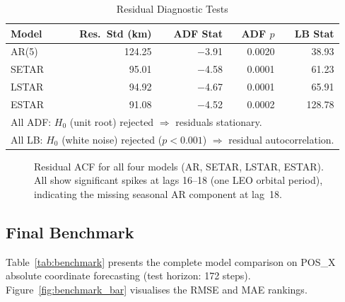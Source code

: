 \documentclass[conference]{IEEEtran}
\begin{document}
\begin{table}[H]
\centering
\caption{Residual Diagnostic Tests}
\label{tab:residuals}
\begin{tabular}{lrrrr}
\toprule
\textbf{Model} & \textbf{Res.\ Std (km)} & \textbf{ADF Stat} & \textbf{ADF $p$} & \textbf{LB Stat} \\
\midrule
AR(5)  & 124.25 & $-$3.91 & 0.0020 & 38.93 \\
SETAR  & 95.01  & $-$4.58 & 0.0001 & 61.23 \\
LSTAR  & 94.92  & $-$4.67 & 0.0001 & 65.91 \\
ESTAR  & 91.08  & $-$4.52 & 0.0002 & 128.78 \\
\bottomrule
\multicolumn{5}{l}{\small All ADF: $H_0$ (unit root) rejected $\Rightarrow$ residuals stationary.}\\
\multicolumn{5}{l}{\small All LB: $H_0$ (white noise) rejected ($p < 0.001$) $\Rightarrow$ residual autocorrelation.}\\
\end{tabular}
\end{table}

\begin{figure}[H]
  \centering
  \fbox{\rule{0pt}{5.5cm}\rule{\linewidth}{0pt}}
  \caption{Residual ACF for all four models (AR, SETAR, LSTAR, ESTAR). All
           show significant spikes at lags 16--18 (one LEO orbital period),
           indicating the missing seasonal AR component at lag~18.}
  \label{fig:acf_resid}
\end{figure}

\subsection{Final Benchmark}

Table~\ref{tab:benchmark} presents the complete model comparison on
POS\_X absolute coordinate forecasting (test horizon: 172 steps).
Figure~\ref{fig:benchmark_bar} visualises the RMSE and MAE rankings.
\end{document}
